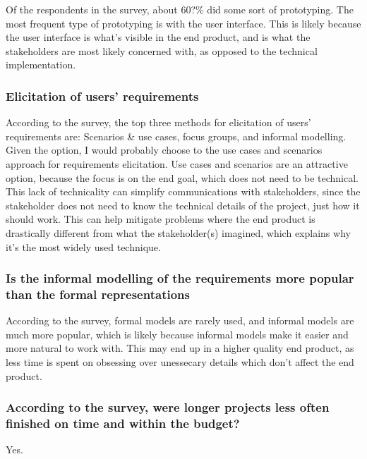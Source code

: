 \documentclass[letterpaper,12pt]{article}
\begin{document}
Of the respondents in the survey, about 60?\% did some sort of prototyping.
The most frequent type of prototyping is with the user interface. This is likely
because the user interface is what's visible in the end product, and is what the
stakeholders are most likely concerned with, as opposed to the technical implementation.
\subsubsection{Elicitation of users' requirements}

According to the survey, the top three methods for
elicitation of users’ requirements are: Scenarios \& use cases, focus groups, and informal modelling.
Given the option, I would probably choose to the use cases and scenarios approach for requirements
elicitation. Use cases and scenarios are an attractive option, because the focus is on the end goal,
which does not need to be technical. This lack of technicality can simplify communications with stakeholders,
since the stakeholder does not need to know the technical details of the project, just how it should work.
This can help mitigate problems where the end product is drastically different from what the stakeholder(s)
imagined, which explains why it's the most widely used technique.

\subsubsection{Is the informal modelling of the requirements more
 popular than the formal representations}

According to the survey, formal models are rarely used, and informal models are
much more popular, which is likely because informal models make it easier and more
natural to work with. This may end up in a higher quality end product, as less time
is spent on obsessing over unessecary details which don't affect the end product.
\subsubsection{According to the survey, were longer projects less often finished on
 time and within the budget?}
Yes.
\end{document}
